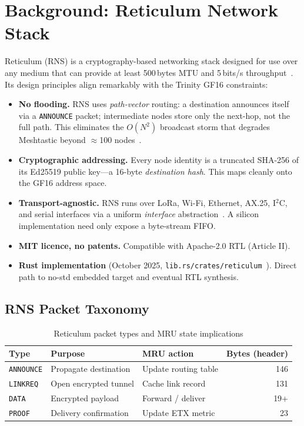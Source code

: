 \section{Background: Reticulum Network Stack}

Reticulum (RNS) is a cryptography-based networking stack designed for
use over any medium that can provide at least 500\,bytes MTU and
5\,bits/s throughput~\cite{rns2018markqvist}.
Its design principles align remarkably with the Trinity GF16 constraints:

\begin{itemize}
  \item \textbf{No flooding.} RNS uses \emph{path-vector} routing:
        a destination announces itself via a \texttt{ANNOUNCE} packet;
        intermediate nodes store only the next-hop, not the full path.
        This eliminates the $O(N^2)$ broadcast storm that degrades
        Meshtastic beyond $\approx$100 nodes~\cite{meshtastic2024analysis}.
  \item \textbf{Cryptographic addressing.} Every node identity is a
        truncated SHA-256 of its Ed25519 public key—a 16-byte
        \emph{destination hash}.  This maps cleanly onto the GF16
        address space.
  \item \textbf{Transport-agnostic.} RNS runs over LoRa, Wi-Fi,
        Ethernet, AX.25, I$^2$C, and serial interfaces via a uniform
        \emph{interface} abstraction~\cite{rns2018markqvist}.
        A silicon implementation need only expose a byte-stream FIFO.
  \item \textbf{MIT licence, no patents.} Compatible with Apache-2.0
        RTL (Article II).
  \item \textbf{Rust implementation} (October 2025,
        \texttt{lib.rs/crates/reticulum}~\cite{rns_rust2025}).
        Direct path to no-std embedded target and eventual RTL synthesis.
\end{itemize}

\subsection{RNS Packet Taxonomy}

\begin{table}[h]
\centering
\caption{Reticulum packet types and MRU state implications}
\label{ch_35_mesh_node:tab:rns-packets}
\begin{tabular}{lllr}
\toprule
Type & Purpose & MRU action & Bytes (header) \\
\midrule
\texttt{ANNOUNCE}   & Propagate destination & Update routing table & 146 \\
\texttt{LINKREQ}    & Open encrypted tunnel & Cache link record    & 131 \\
\texttt{DATA}       & Encrypted payload     & Forward / deliver    & 19+ \\
\texttt{PROOF}      & Delivery confirmation & Update ETX metric    & 23  \\
\bottomrule
\end{tabular}
\end{table}

